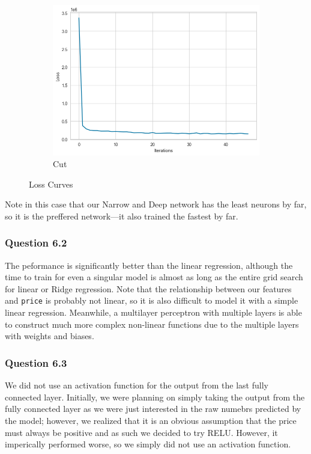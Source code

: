 \documentclass[11pt,letterpaper]{article}
\begin{document}
\begin{figure}[H]
\begin{subfigure}[b]{0.3\textwidth}
        \includegraphics[width=\textwidth]{../Figures/mlp/mlp3.png}
        \caption{Cut}
        \label{fig:cutBox}
    \end{subfigure}
       \caption{Loss Curves}
       \label{fig:boxPlots}
\end{figure}
Note in this case that our Narrow and Deep network has the least neurons by far, so it is the 
preffered network—it also trained the fastest by far. 


\subsubsection*{Question 6.2}
The peformance is significantly better than the linear regression, although the time to train for even a singular 
model is almost as long as the entire grid search for linear or Ridge regression. Note that the relationship 
between our features and  \texttt{price} is probably not linear, so it is also difficult to model it with 
a simple linear regression. Meanwhile, a multilayer perceptron with multiple layers is able to construct much more 
complex non-linear functions due to the multiple layers with weights and biases. 
\subsubsection*{Question 6.3}
We did not use an activation function for the output from the last fully connected layer. Initially, we were planning on 
simply taking the output from the fully connected layer as we were just interested in the raw numebrs predicted by 
the model; however, we realized that it is an obvious assumption that the price must always be positive and as such
we decided to try RELU. However, it imperically performed worse, so we simply did not use an activation function. 
\end{document}

